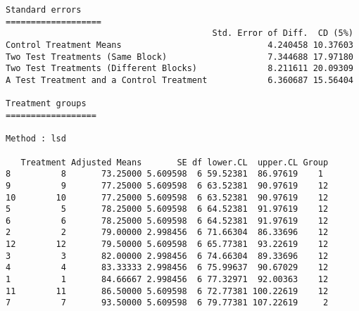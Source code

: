 \documentclass[]{article}
\newenvironment{Shaded}{\begin{snugshade}}{\end{snugshade}}
\newcommand{\CommentTok}[1]{\textcolor[rgb]{0.56,0.35,0.01}{\textit{#1}}}
\newcommand{\DataTypeTok}[1]{\textcolor[rgb]{0.13,0.29,0.53}{#1}}
\newcommand{\FloatTok}[1]{\textcolor[rgb]{0.00,0.00,0.81}{#1}}
\newcommand{\KeywordTok}[1]{\textcolor[rgb]{0.13,0.29,0.53}{\textbf{#1}}}
\newcommand{\NormalTok}[1]{#1}
\newcommand{\OperatorTok}[1]{\textcolor[rgb]{0.81,0.36,0.00}{\textbf{#1}}}
\newcommand{\OtherTok}[1]{\textcolor[rgb]{0.56,0.35,0.01}{#1}}
\newcommand{\StringTok}[1]{\textcolor[rgb]{0.31,0.60,0.02}{#1}}
\begin{document}
\begin{verbatim}
Standard errors
===================
                                         Std. Error of Diff.  CD (5%)
Control Treatment Means                             4.240458 10.37603
Two Test Treatments (Same Block)                    7.344688 17.97180
Two Test Treatments (Different Blocks)              8.211611 20.09309
A Test Treatment and a Control Treatment            6.360687 15.56404

Treatment groups
==================

Method : lsd

   Treatment Adjusted Means       SE df lower.CL  upper.CL Group
8          8       73.25000 5.609598  6 59.52381  86.97619    1 
9          9       77.25000 5.609598  6 63.52381  90.97619    12
10        10       77.25000 5.609598  6 63.52381  90.97619    12
5          5       78.25000 5.609598  6 64.52381  91.97619    12
6          6       78.25000 5.609598  6 64.52381  91.97619    12
2          2       79.00000 2.998456  6 71.66304  86.33696    12
12        12       79.50000 5.609598  6 65.77381  93.22619    12
3          3       82.00000 2.998456  6 74.66304  89.33696    12
4          4       83.33333 2.998456  6 75.99637  90.67029    12
1          1       84.66667 2.998456  6 77.32971  92.00363    12
11        11       86.50000 5.609598  6 72.77381 100.22619    12
7          7       93.50000 5.609598  6 79.77381 107.22619     2
\end{verbatim}

\begin{Shaded}
\end{Shaded}
\end{document}
